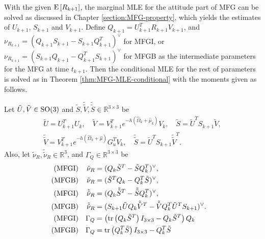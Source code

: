 With the given $\mathrm{E}\left[ R_{k+1} \right]$, the marginal MLE for the attitude part of MFG can be solved as discussed in Chapter \ref{section:MFG-property}, which yields the estimates of $U_{k+1}$, $S_{k+1}$ and $V_{k+1}$.
Define $Q_{k+1} = U_{k+1}^TR_{k+1}V_{k+1}$, and $\nu_{R_{k+1}} = (Q_{k+1}S_{k+1}-S_{k+1}Q_{k+1}^T)^\vee$ for MFGI, or $\nu_{R_{k+1}} = (S_{k+1}Q_{k+1}-Q_{k+1}^TS_{k+1})^\vee$ for MFGB as the intermediate parameters for the MFG at time $t_{k+1}$.
Then the conditional MLE for the rest of parameters is solved as in Theorem \ref{thm:MFG-MLE-conditional} with the moments given as follows.

\begin{theorem} \label{thm:attEst-prop-otherMoments}
	Let $\tilde U, \tilde V\in\mathrm{SO}(3)$ and $\tilde S, \tilde{\tilde{V}}, \tilde{\tilde{S}} \in \mathbb{R}^{3\times 3}$ be
	\begin{gather*}
		\tilde{U} = U_{k+1}^T U_k, \quad 
		\tilde{V} = V_{k+1}^T e^{-h(\hat{\Omega}_k+\hat{\mu}_k)} V_k, \quad
		\tilde{S} = \tilde{U}^T S_{k+1} \tilde{V},\\
		\tilde{\tilde{V}} = V_{k+1}^T e^{-h(\hat{\Omega}_k+\hat{\mu})}G_u^TV_k, \quad
		\tilde{\tilde{S}} = \tilde{U}^TS_{k+1}\tilde{\tilde{V}}^T.
	\end{gather*}
	Also, let $\tilde{\nu}_R, \tilde{\tilde\nu}_R \in\mathbb{R}^3$, and $\Gamma_Q\in\mathbb{R}^{3\times 3}$ be
	\begin{subequations}
		\begin{flalign}
			\text{(MFGI)} && \tilde{\nu}_R &= (Q_k\tilde{S}^T-\tilde{S}Q_k^T)^\vee, && \\
			\text{(MFGB)} && \tilde{\nu}_R &= (\tilde{S}^TQ_k-Q_k^T\tilde{S})^\vee, && \\ \StepSubequations
			\text{(MFGI)} && \tilde{\tilde{\nu}}_R &= (Q_k\tilde{\tilde{S}}^T-\tilde{\tilde{S}}Q_k^T)^\vee, && \label{eqn:attEst-prop-vRTT-MFGI} \\
			\text{(MFGB)} && \tilde{\tilde{\nu}}_R &= (S_{k+1}\tilde{U}Q_k\tilde{\tilde{V}}^T - \tilde{\tilde{V}}Q_k^T\tilde{U}^TS_{k+1})^\vee. && \label{eqn:attEst-prop-vRTT-MFGB} \\ \StepSubequations
			\text{(MFGI)} && \Gamma_Q &= \left( \tr{Q_k\tilde{S}^T}I_{3\times 3} - Q_k\tilde{S}^T \right) Q_k && \label{eqn:attEst-prop-GammaQ-MFGI} \\
			\text{(MFGB)} && \Gamma_Q &= \tr{Q_k^T\tilde{S}}I_{3\times 3} - Q_k^T\tilde{S} && \label{eqn:attEst-prop-GammaQ-MFGB}
		\end{flalign}
	\end{subequations}

\end{theorem}
